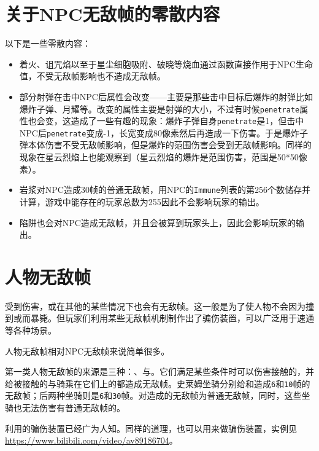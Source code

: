 \section{关于NPC无敌帧的零散内容}
以下是一些零散内容：
\begin{itemize}
\item 着火、诅咒焰以至于星尘细胞吸附、破晓等烧血通过函数直接作用于NPC生命值，不受无敌帧影响也不造成无敌帧。
\item 部分射弹在击中NPC后属性会改变——主要是那些击中目标后爆炸的射弹比如爆炸子弹、月耀等。改变的属性主要是射弹的大小，不过有时候\lstinline{penetrate}属性也会变，这造成了一些有趣的现象：爆炸子弹自身\lstinline{penetrate}是1，但击中NPC后\lstinline{penetrate}变成-1，长宽变成80像素然后再造成一下伤害。于是爆炸子弹本体伤害不受无敌帧影响，但是爆炸的范围伤害会受到无敌帧影响。同样的现象在星云烈焰上也能观察到（星云烈焰的爆炸是范围伤害，范围是50*50像素）。
\item 岩浆对NPC造成30帧的普通无敌帧，用NPC的\lstinline{Immune}列表的第256个数储存并计算，游戏中能存在的玩家总数为255因此不会影响玩家的输出。
\item 陷阱也会对NPC造成无敌帧，并且会被算到玩家头上，因此会影响玩家的输出。
\end{itemize}

\section{人物无敌帧}\label{sec29}
受到伤害，或在其他的某些情况下也会有无敌帧。这一般是为了使人物不会因为撞到或而暴毙。但玩家们利用某些无敌帧机制制作出了骗伤装置，可以广泛用于速通等各种场景。

人物无敌帧相对NPC无敌帧来说简单很多。

第一类人物无敌帧的来源是三种：、与。它们满足某些条件时可以伤害接触的，并给被接触的与骑乘在它们上的都造成无敌帧。史莱姆坐骑分别给和造成\lstinline{6}和\lstinline{10}帧的无敌帧；后两种坐骑则是\lstinline{6}和\lstinline{30}帧。对造成的无敌帧为普通无敌帧，同时，这些坐骑也无法伤害有普通无敌帧的。

\begin{example}
利用的骗伤装置已经广为人知。同样的道理，也可以用来做骗伤装置，实例见\url{https://www.bilibili.com/video/av89186704}。
\end{example}

